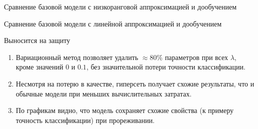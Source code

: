 \documentclass[9pt,pdf,hyperref={unicode}]{beamer}
\begin{document}
\begin{frame}[shrink=5]{Сравнение базовой модели с низкоранговой аппроксимацией и дообучением}
\begin{figure}[h]
\begin{minipage}[h]{0.49\linewidth}
\end{minipage}
\hfill
\begin{minipage}[h]{0.49\linewidth}
\end{minipage}

\label{ris:image1}
\end{figure}
\end{frame}
\begin{frame}[shrink=5]{Сравнение базовой модели с линейной аппроксимацией и дообучением}
\begin{figure}[h]
\begin{minipage}[h]{0.49\linewidth}
\end{minipage}
\hfill
\begin{minipage}[h]{0.49\linewidth}
\end{minipage}

\label{ris:image1}
\end{figure}
\end{frame}


\begin{frame}{Выносится на защиту}
\justifying

	\begin{enumerate}
	\justifying
		\item  Вариационный метод позволяет удалить $ \approx 80\% $ параметров при всех $\lambda$, кроме значений $0$  и $0.1$, без значительной потери точности классификации.
		\item  Несмотря на потерю в качестве, гиперсеть получает схожие результаты, что и обычные модели при меньших вычислительных затратах.
		\item  По графикам видно, что модель сохраняет схожие свойства (к примеру точность классификации) при прореживании.
	\end{enumerate}
	

\end{frame}
\end{document}
